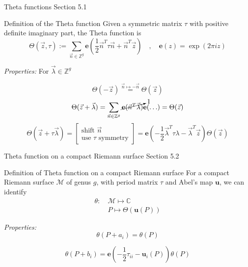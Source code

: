\documentclass[11pt,aspectratio=169]{beamer}
\newcommand{\ee}[0]{\mathbf{e}}
\begin{document}
\begin{frame}{Theta functions}{\tiny \cite{Ber06} Section 5.1}
    \begin{block}{Definition of the Theta function}
        Given a symmetric matrix $\tau$ with positive definite imaginary part, the Theta function is
        \[\Theta(\vec z, \tau) := \sum_{\vec n \in \mathbb Z^g} \ee \left( \frac{1}{2} \vec n^T \tau \vec n + \vec n^T \vec z \right) \quad , \quad \ee(z) = \exp(2\pi i z)\]
    \end{block}
    \emph{Properties:} For $\vec \lambda \in \mathbb Z^g$

    \[\Theta(-\vec z) \overset{\vec n \mapsto -\vec n}{=} \Theta(\vec z)\]
    \[\Theta(\vec z + \vec \lambda) = \sum_{\vec n \in \mathbb Z^g} \cancelto{1}{\ee ( \vec n^T \vec \lambda)} \ee(\ldots) = \Theta(\vec z)\]
    \[\Theta(\vec z + \tau \vec \lambda) = \begin{bmatrix} \text{shift } \vec n \\ \text{use }\tau\text{ symmetry}\end{bmatrix} = \ee \left(- \frac{1}{2}\vec \lambda^T \tau \lambda-\vec \lambda^T \vec z\right)\Theta(\vec z)\]
\end{frame}

\begin{frame}{Theta function on a compact Riemann surface}{\tiny \cite{Ber06} Section 5.2}
    \begin{block}{Definition of Theta function on a compact Riemann surface}
        For a compact Riemann surface $\mathcal M$ of genus $g$, with period matrix $\tau$ and Abel's map $\mathbf{u}$, we can identify
        \begin{align*}
            \theta : \ & \mathcal M \mapsto \mathbb C \\
            & P \mapsto \Theta(\mathbf{u}(P))
        \end{align*}
    \end{block}

    \emph{Properties:}
    \[ \theta(P + a_i) = \theta(P) \]

    \[ \theta(P + b_i) = \ee\left(- \frac{1}{2} \tau_{ii} - \mathbf{u}_i(P)\right)\theta(P) \]
\end{frame}
\end{document}

